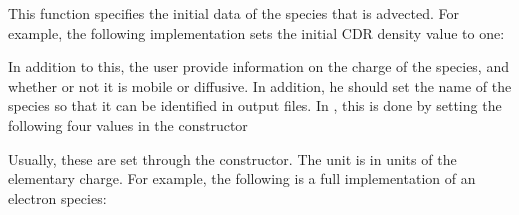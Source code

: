 \documentclass[letterpaper,10pt,english]{sphinxmanual}
\begin{document}
\begin{sphinxVerbatim}[commandchars=\\\{\},formatcom=\scriptsize]
          
\end{sphinxVerbatim}

This function specifies the initial data of the species that is advected. For example, the following implementation sets the initial CDR density value to one:

\begin{sphinxVerbatim}[commandchars=\\\{\},formatcom=\scriptsize]
        
    
\end{sphinxVerbatim}

In addition to this, the user  provide information on the charge of the species, and whether or not it is mobile or diffusive. In addition, he should set the name of the species so that it can be identified in output files. In , this is done by setting the following four values in the constructor

\begin{sphinxVerbatim}[commandchars=\\\{\},formatcom=\scriptsize]
  
        
    
       
\end{sphinxVerbatim}

Usually, these are set through the constructor. The  unit is in units of the elementary charge. For example, the following is a full implementation of an electron species:
\end{document}
